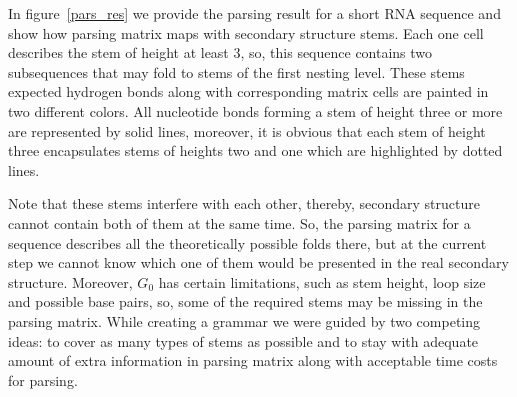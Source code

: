 \documentclass[runningheads]{llncs}
\begin{document}
In figure~\ref{pars_res} we provide the parsing result for a short RNA sequence and show how parsing matrix maps with secondary structure stems. Each one cell describes the stem of height at least 3, so, this sequence contains two subsequences that may fold to stems of the first nesting level. These stems expected hydrogen bonds along with corresponding matrix cells are painted in two different colors. All nucleotide bonds forming a stem of height three or more are represented by solid lines, moreover, it is obvious that each stem of height three encapsulates stems of heights two and one which are highlighted by dotted lines.

Note that these stems interfere with each other, thereby, secondary structure cannot contain both of them at the same time. So, the parsing matrix for a sequence describes all the theoretically possible folds there, but at the current step we cannot know which one of them would be presented in the real secondary structure. Moreover, $G_0$ has certain limitations, such as stem height, loop size and possible base pairs, so, some of the required stems may be missing in the parsing matrix. While creating a grammar we were guided by two competing ideas: to cover as many types of stems as possible and to stay with adequate amount of extra information in parsing matrix along with acceptable time costs for parsing.
\end{document}
